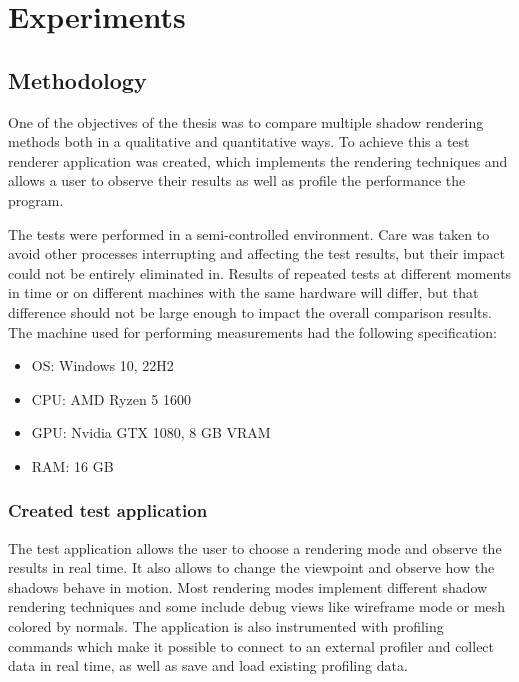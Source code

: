\chapter{Experiments}
\label{section:chapter_4}

\section{Methodology}
One of the objectives of the thesis was to compare multiple shadow rendering methods both in a qualitative and quantitative ways. To achieve this a test renderer application was created, which implements the rendering techniques and allows a user to observe their results as well as profile the performance the program.

The tests were performed in a semi-controlled environment. Care was taken to avoid other processes interrupting and affecting the test results, but their impact could not be entirely eliminated in. Results of repeated tests at different moments in time or on different machines with the same hardware will differ, but that difference should not be large enough to impact the overall comparison results. 
The machine used for performing measurements had the following specification:
\begin{itemize}
    \item OS: Windows 10, 22H2
    \item CPU: AMD Ryzen 5 1600
    \item GPU: Nvidia GTX 1080, 8 GB VRAM
    \item RAM: 16 GB
\end{itemize}

\subsection{Created test application}
The test application allows the user to choose a rendering mode and observe the results in real time. It also allows to change the viewpoint and observe how the shadows behave in motion. Most rendering modes implement different shadow rendering techniques and some include debug views like wireframe mode or mesh colored by normals. The application is also instrumented with profiling commands which make it possible to connect to an external profiler and collect data in real time, as well as save and load existing profiling data.

